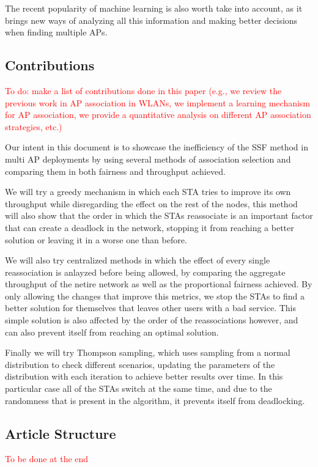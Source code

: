 \documentclass{article}
\begin{document}
	The recent popularity of machine learning is also worth take into account, as it brings new ways of analyzing all this information and making better decisions when finding multiple APs.
	
	
	
	\subsection{Contributions}
	\label{section:contributions}
		\textcolor{red}{To do: make a list of contributions done in this paper (e.g., we review the previous work in AP association in WLANs, we implement a learning mechanism for AP association, we provide a quantitative analysis on different AP association strategies, etc.)}
		
		Our intent in this document is to showcase the inefficiency of the SSF method in multi AP deployments by using several methods of association selection and comparing them in both fairness and throughput achieved.
		
		We will try a greedy mechanism in which each STA tries to improve its own throughput while disregarding the effect on the rest of the nodes, this method will also show that the order in which the STAs reassociate is an important factor that can create a deadlock in the network, stopping it from reaching a better solution or leaving it in a worse one than before.
		
		We will also try centralized methods in which the effect of every single reassociation is anlayzed before being allowed, by comparing the aggregate throughput of the netire network as well as the proportional fairness achieved. By only allowing the changes that improve this metrics, we stop the STAs to find a better solution for themselves that leaves other users with a bad service. This simple solution is also affected by the order of the reassociations however, and can also prevent itself from reaching an optimal solution.
		
		Finally we will try Thompson sampling, which uses sampling from a normal distribution to check different scenarios, updating the parameters of the distribution with each iteration to achieve better results over time. In this particular case all of the STAs switch at the same time, and due to the randomness that is present in the algorithm, it prevents itself from deadlocking.
		
		
	\subsection{Article Structure}
	\label{section:article_structure}
			\textcolor{red}{To be done at the end}
			
\end{document}
